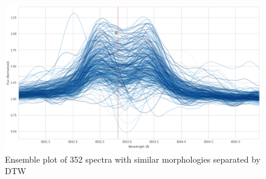 \begin{figure}[!htb]
\centering
\includegraphics[scale=0.42]{figures/class_11_45.png}
\caption{Ensemble plot of 352 spectra with similar morphologies separated by DTW}
\end{figure}





